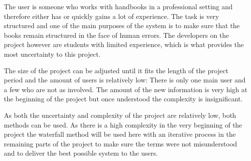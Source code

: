 The user is someone who works with handbooks in a professional setting and therefore either has or quickly gains a lot of experience. The task is very structured and one of the main purposes of the system is to make sure that the books remain structured in the face of human errors. The developers on the project however are students with limited experience, which is what provides the most uncertainty to this project. %

The size of the project can be adjusted until it fits the length of the project period and the amount of users is relatively low: There is only one main user and a few who are not as involved. The amount of the new information is very high at the beginning of the project but once understood the complexity is insignificant.

As both the uncertainty and complexity of the project are relatively low, both methods can be used. As there is a high complexity in the very beginning of the project the waterfall method will be used here with an iterative process in the remaining parts of the project to make sure the terms were not misunderstood and to deliver the best possible system to the users. %


